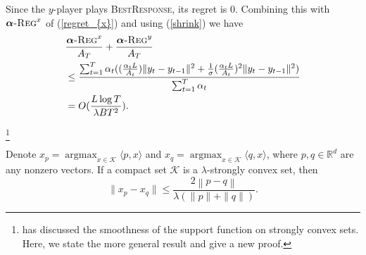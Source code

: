 \documentclass[pmlr]{jmlr} %
\def\reals{\mathbb{R}}
\def\reals{\mathbb{R}}
\def\K{\mathcal{K}}
\def\argmax{\mathop{\arg\max}}
\def\balpha{\boldsymbol{\alpha}}
\def\BR{\textsc{BestResponse}\xspace}
\newcommand{\norm}[1]{\left\lVert#1\right\rVert}
\newcommand{\regret}[1]{\balpha\textsc{-Reg}^{#1}}
\begin{document}
Since the $y$-player plays \BR, its regret is $0$.
Combining this with $\regret{x}$ of (\ref{regret_{x}}) and using (\ref{shrink})
we have 
\begin{equation}
\begin{aligned}
&\frac{ \regret{x} }{ A_{T}} + \frac{ \regret{y} }{ A_{T}}
\\ & \leq  \frac{\sum_{t=1}^{T}
\alpha_{t}  ( (\frac{\alpha_{t} L}{A_{t}})  \| y_{t} - y_{t-1} \|^{2} + \frac{1}{\sigma} (\frac{\alpha_{t} L }{A_{t}})^{2}  \| y_{t} - y_{t-1} \|^{2} ) 
 }{ \sum_{t=1}^{T} \alpha_{t}}
\\ & =  O( \frac{L \log T }{\lambda B T^{2}}  ).
\end{aligned}
\end{equation}



\begin{lemma}  \label{lm:lip}
\footnote{\cite{P96} has discussed the smoothness of the support function on strongly convex sets.
Here, we state the more general result and give a new proof.}

Denote  
$x_{p} = \argmax_{x \in \K} \langle p, x\rangle $ and $x_{q} = \argmax_{x \in \K} \langle q, x\rangle $, where $p,q \in \reals^{d}$ are any nonzero vectors.  
If a compact set $\K$ is a $\lambda$-strongly convex set,
then 
\begin{equation}
    \| x_{p} - x_{q} \| \leq \frac{2 \norm{p - q}}{\lambda ( \| p \| + \|q \| )}.
\end{equation}
\end{lemma}
\end{document}
